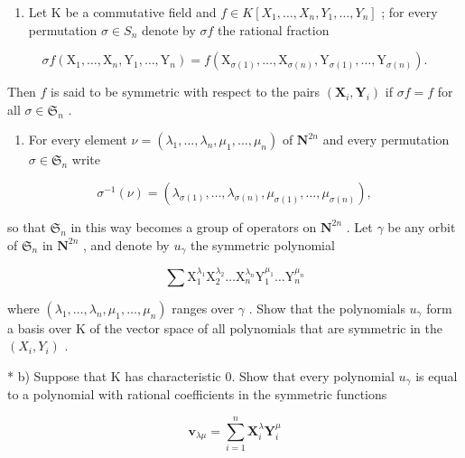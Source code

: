 \begin{enumerate}
\def\labelenumi{\arabic{enumi})}
\setcounter{enumi}{4}
\tightlist
\item
  Let K be a commutative field and \(f \in K[X_{1}, \ldots, X_{n}, Y_{1}, \ldots, Y_{n}]\) ; for every permutation \(\sigma \in S_{n}\) denote by \(\sigma f\) the rational fraction
\end{enumerate}

\[
\sigma f \left(\mathrm{X} _ {1}, \dots , \mathrm{X} _ {n}, \mathrm{Y} _ {1}, \dots , \mathrm{Y} _ {n}\right) = f \left(\mathrm{X} _ {\sigma (1)}, \dots , \mathrm{X} _ {\sigma (n)}, \mathrm{Y} _ {\sigma (1)}, \dots , \mathrm{Y} _ {\sigma (n)}\right).
\]

Then \(f\) is said to be symmetric with respect to the pairs \((\mathbf{X}_i, \mathbf{Y}_i)\) if \(\sigma f = f\) for all \(\sigma \in \mathfrak{S}_n\) .

\begin{enumerate}
\def\labelenumi{\alph{enumi})}
\tightlist
\item
  For every element \(\nu = (\lambda_1, \ldots, \lambda_n, \mu_1, \ldots, \mu_n)\) of \(\mathbf{N}^{2n}\) and every permutation \(\sigma \in \mathfrak{S}_n\) write
\end{enumerate}

\[
\sigma^ {- 1} (\nu) = \left(\lambda_ {\sigma (1)}, \dots , \lambda_ {\sigma (n)}, \mu_ {\sigma (1)}, \dots , \mu_ {\sigma (n)}\right),
\]

so that \(\mathfrak{S}_n\) in this way becomes a group of operators on \(\mathbf{N}^{2n}\) . Let \(\gamma\) be any orbit of \(\mathfrak{S}_n\) in \(\mathbf{N}^{2n}\) , and denote by \(u_{\gamma}\) the symmetric polynomial

\[
\sum \mathrm{X} _ {1} ^ {\lambda_ {1}} \mathrm{X} _ {2} ^ {\lambda_ {2}} \dots \mathrm{X} _ {n} ^ {\lambda_ {n}} \mathrm{Y} _ {1} ^ {\mu_ {1}} \dots \mathrm{Y} _ {n} ^ {\mu_ {n}}
\]

where \((\lambda_{1},\ldots,\lambda_{n},\mu_{1},\ldots,\mu_{n})\) ranges over \(\gamma\) . Show that the polynomials \(u_{\gamma}\) form a basis over K of the vector space of all polynomials that are symmetric in the \((X_{i},Y_{i})\) .

* b) Suppose that K has characteristic 0. Show that every polynomial \(u_{\gamma}\) is equal to a polynomial with rational coefficients in the symmetric functions

\[
\boldsymbol {v} _ {\lambda \mu} = \sum_ {i = 1} ^ {n} \mathbf {X} _ {i} ^ {\lambda} \mathbf {Y} _ {i} ^ {\mu}
\]

